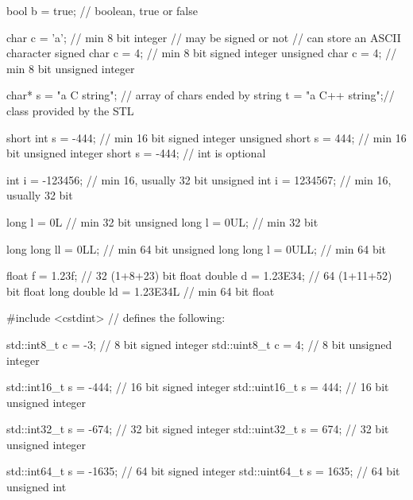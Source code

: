 \begin{frame}[fragile]
  \begin{cppcode}
    bool b = true;            // boolean, true or false

    char c = 'a';             // min 8 bit integer
                              // may be signed or not
                              // can store an ASCII character
    signed char c = 4;        // min 8 bit signed integer
    unsigned char c = 4;      // min 8 bit unsigned integer

    char* s = "a C string";   // array of chars ended by \0
    string t = "a C++ string";// class provided by the STL

    short int s = -444;       // min 16 bit signed integer
    unsigned short s = 444;   // min 16 bit unsigned integer
    short s = -444;           // int is optional
  \end{cppcode}
\end{frame}
\begin{frame}[fragile]
  \begin{cppcode}
    int i = -123456;          // min 16, usually 32 bit
    unsigned int i = 1234567; // min 16, usually 32 bit

    long l = 0L               // min 32 bit
    unsigned long l = 0UL;    // min 32 bit

    long long ll = 0LL;          // min 64 bit
    unsigned long long l = 0ULL; // min 64 bit

    float f = 1.23f;          // 32 (1+8+23) bit float
    double d = 1.23E34;       // 64 (1+11+52) bit float
    long double ld = 1.23E34L // min 64 bit float
  \end{cppcode}
\end{frame}

\begin{frame}[fragile]
  \begin{cppcode}
    #include <cstdint> // defines the following:

    std::int8_t c = -3;     // 8 bit signed integer
    std::uint8_t c = 4;     // 8 bit unsigned integer

    std::int16_t s = -444;  // 16 bit signed integer
    std::uint16_t s = 444;  // 16 bit unsigned integer

    std::int32_t s = -674;  // 32 bit signed integer
    std::uint32_t s = 674;  // 32 bit unsigned integer

    std::int64_t s = -1635; // 64 bit signed integer
    std::uint64_t s = 1635; // 64 bit unsigned int
  \end{cppcode}
\end{frame}

